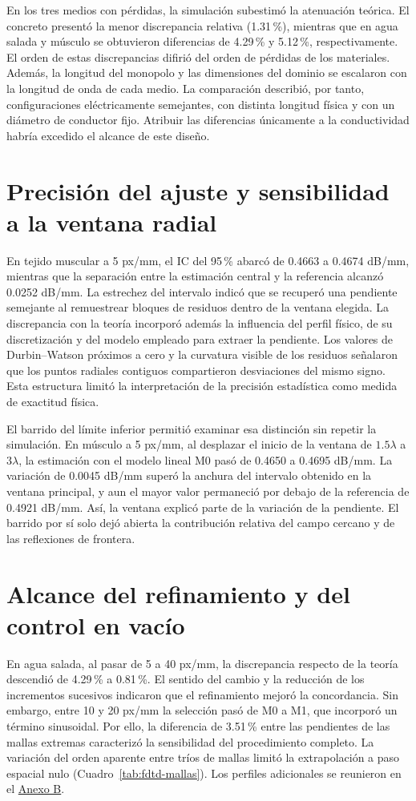 En los tres medios con pérdidas, la simulación subestimó la atenuación teórica. El concreto presentó la menor discrepancia relativa (1.31\,\%), mientras que en agua salada y músculo se obtuvieron diferencias de 4.29\,\% y 5.12\,\%, respectivamente. El orden de estas discrepancias difirió del orden de pérdidas de los materiales. Además, la longitud del monopolo y las dimensiones del dominio se escalaron con la longitud de onda de cada medio. La comparación describió, por tanto, configuraciones eléctricamente semejantes, con distinta longitud física y con un diámetro de conductor fijo. Atribuir las diferencias únicamente a la conductividad habría excedido el alcance de este diseño.

\section{Precisión del ajuste y sensibilidad a la ventana radial}
En tejido muscular a 5 px/mm, el IC del 95\,\% abarcó de 0.4663 a 0.4674 dB/mm, mientras que la separación entre la estimación central y la referencia alcanzó 0.0252 dB/mm. La estrechez del intervalo indicó que se recuperó una pendiente semejante al remuestrear bloques de residuos dentro de la ventana elegida. La discrepancia con la teoría incorporó además la influencia del perfil físico, de su discretización y del modelo empleado para extraer la pendiente. Los valores de Durbin--Watson próximos a cero y la curvatura visible de los residuos señalaron que los puntos radiales contiguos compartieron desviaciones del mismo signo. Esta estructura limitó la interpretación de la precisión estadística como medida de exactitud física.

El barrido del límite inferior permitió examinar esa distinción sin repetir la simulación. En músculo a 5 px/mm, al desplazar el inicio de la ventana de $1.5\lambda$ a $3\lambda$, la estimación con el modelo lineal M0 pasó de 0.4650 a 0.4695 dB/mm. La variación de 0.0045 dB/mm superó la anchura del intervalo obtenido en la ventana principal, y aun el mayor valor permaneció por debajo de la referencia de 0.4921 dB/mm. Así, la ventana explicó parte de la variación de la pendiente. El barrido por sí solo dejó abierta la contribución relativa del campo cercano y de las reflexiones de frontera.

\section{Alcance del refinamiento y del control en vacío}
En agua salada, al pasar de 5 a 40 px/mm, la discrepancia respecto de la teoría descendió de 4.29\,\% a 0.81\,\%. El sentido del cambio y la reducción de los incrementos sucesivos indicaron que el refinamiento mejoró la concordancia. Sin embargo, entre 10 y 20 px/mm la selección pasó de M0 a M1, que incorporó un término sinusoidal. Por ello, la diferencia de 3.51\,\% entre las pendientes de las mallas extremas caracterizó la sensibilidad del procedimiento completo. La variación del orden aparente entre tríos de mallas limitó la extrapolación a paso espacial nulo (Cuadro~\ref{tab:fdtd-mallas}). Los perfiles adicionales se reunieron en el \hyperref[an:fdtd-perfiles]{Anexo B}.

